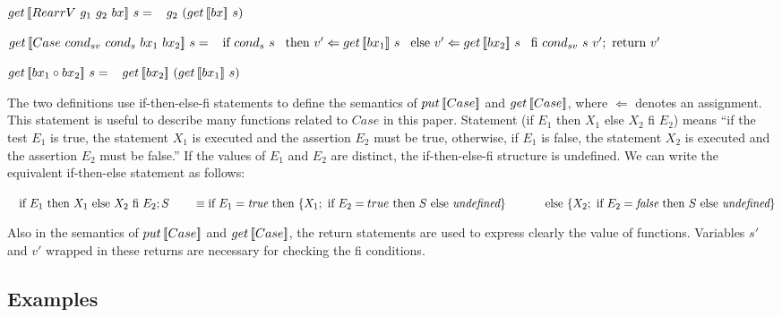 \begin{multicols}{2}
\begin{definition}
        \noindent $get \, [\![RearrV \ g_1 \ g_2 \ bx]\!] \ s = \\ 
            \hspace*{3mm} g_2 \ (get \, [\![bx]\!] \ s)$

        \noindent $\getbx{\casebx{cond_{sv}}{cond_{s}}{bx_1}{bx_2}}{s} = \\
            \tab \textnormal{if} \ {cond_{s} \ s} \\
            \tab \textnormal{then} \ v' \Leftarrow \getbx{bx_1}{s} \\ 
            \tab \textnormal{else} \ v' \Leftarrow \getbx{bx_2}{s} \\ 
            \tab \textnormal{fi} \ {cond_{sv} \ s \ v'}; \ \textnormal{return} \ v'$

        \noindent $get \, [\![bx_1 \circ bx_2]\!] \ s = \\ 
            \hspace*{3mm} get \, [\![bx_2]\!] \ (get \, [\![bx_1]\!] \ s)$
    \end{definition}
\end{multicols}

The two definitions use if-then-else-fi statements 
to define the semantics of $put \, [\![Case]\!]$ and $get \, [\![Case]\!]$, where $\Leftarrow$ denotes an assignment. This statement is useful to describe many functions related to $Case$ in this paper. Statement (if $E_1$ then $X_1$ else $X_2$ fi $E_2$) means ``if the test $E_1$ is true, the statement $X_1$ is executed and the assertion $E_2$ must be true, otherwise, if $E_1$ is false, the statement $X_2$ is executed and the assertion $E_2$ must be false.'' If the values of $E_1$ and $E_2$ are distinct, the if-then-else-fi structure is undefined. We can write the equivalent if-then-else statement as follows:

\smallvspace
$\tab \text{if } E_1 \text{ then } X_1 \text{ else } X_2 \text{ fi } E_2; S\\
\tabs{2} \ \equiv \text{if }E_1 = \textit{true} \text{ then } \{ X_1; \text{ if } E_2 = true \text{ then } S \text{ else } \textit{undefined}\}\\
    \tabs{4} \text{else } \{ X_2; \text{ if } E_2 = \textit{false} \text{ then } S \text{ else } \textit{undefined} \}$
\smallvspace

Also in the semantics of $put \, [\![Case]\!]$ and $get \, [\![Case]\!]$, the return statements are used to express clearly the value of functions. Variables $s'$ and $v'$ wrapped in these returns are necessary for checking the fi conditions.

\subsection{Examples}

